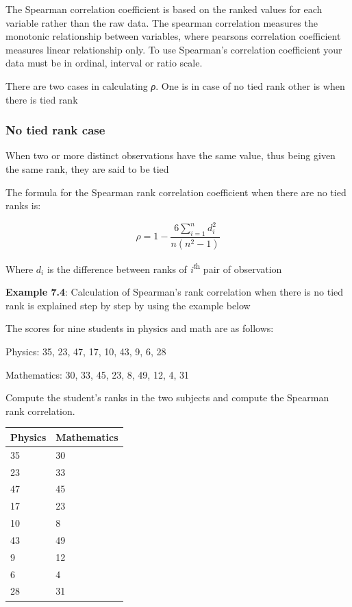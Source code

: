 \documentclass[
]{book}
\begin{document}
The Spearman correlation coefficient is based on the ranked values for
each variable rather than the raw data. The spearman correlation
measures the monotonic relationship between variables, where pearsons
correlation coefficient measures linear relationship only. To use
Spearman's correlation coefficient your data must be in ordinal,
interval or ratio scale.

There are two cases in calculating \emph{ρ}. One is in case of no tied rank
other is when there is tied rank

\hypertarget{no-tied-rank-case}{%
\subsubsection{No tied rank case}\label{no-tied-rank-case}}

When two or more distinct observations have the same
value, thus being given the same rank, they are said to be tied

The formula for the Spearman rank correlation coefficient when there are
no tied ranks is:

\[\rho = 1 - \frac{6\sum_{i = 1}^{n}d_{i}^{2}}{n\left( n^{2} - 1 \right)}\]

Where \(d_{i}\) is the difference between ranks of \emph{i\textsuperscript{t}}\textsuperscript{h} pair of
observation

\textbf{Example 7.4}: Calculation of Spearman's rank correlation when there is
no tied rank is explained step by step by using the example below

The scores for nine students in physics and math are as follows:

Physics: 35, 23, 47, 17, 10, 43, 9, 6, 28

Mathematics: 30, 33, 45, 23, 8, 49, 12, 4, 31

Compute the student's ranks in the two subjects and compute the Spearman
rank correlation.

\begin{longtable}[]{@{}ll@{}}
\toprule
Physics & Mathematics \\
\midrule
\endhead
35 & 30 \\
23 & 33 \\
47 & 45 \\
17 & 23 \\
10 & 8 \\
43 & 49 \\
9 & 12 \\
6 & 4 \\
28 & 31 \\
\bottomrule
\end{longtable}
\end{document}
